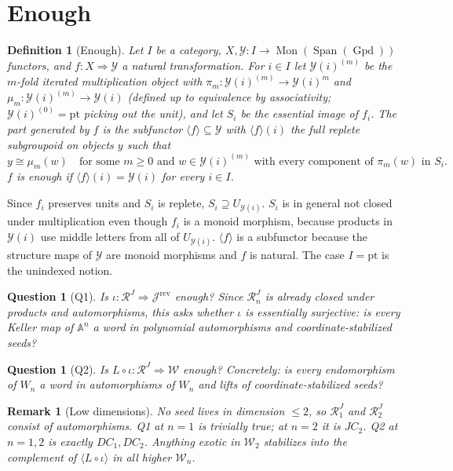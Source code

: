 \documentclass[11pt]{article}
\theoremstyle{change}
\newtheorem{definition}[equation]{Definition}
\newtheorem{question}[equation]{Question}
\newtheorem{remark}[equation]{Remark}
\theoremstyle{nonumberplain}
\renewcommand\AA{{\mathbb A}}
\newcommand\cJ{{\mathcal J}}
\newcommand\cW{{\mathcal W}}
\newcommand\cR{{\mathcal R}}
\newcommand\cY{{\mathcal Y}}
\newcommand\rev{{\mathrm{rev}}}
\DeclareMathOperator{\Gpd}{Gpd}
\DeclareMathOperator{\Span}{Span}
\DeclareMathOperator{\Mon}{Mon}
\begin{document}
\section{Enough}

\begin{definition}[Enough\label{enough}]
Let $I$ be a category, $X, \cY : I \to \Mon(\Span(\Gpd))$ functors, and $f : X \Rightarrow \cY$ a natural transformation. For $i \in I$ let $\cY(i)^{(m)}$ be the $m$-fold iterated multiplication object with $\pi_m : \cY(i)^{(m)} \to \cY(i)^m$ and $\mu_m : \cY(i)^{(m)} \to \cY(i)$ (defined up to equivalence by associativity; $\cY(i)^{(0)} = \mathrm{pt}$ picking out the unit), and let $S_i$ be the essential image of $f_i$. The \emph{part generated by $f$} is the subfunctor $\langle f \rangle \subseteq \cY$ with $\langle f \rangle(i)$ the full replete subgroupoid on objects $y$ such that
\begin{equation*}
y \cong \mu_m(w) \quad \text{for some } m \geq 0 \text{ and } w \in \cY(i)^{(m)} \text{ with every component of } \pi_m(w) \text{ in } S_i.
\end{equation*}
$f$ is \emph{enough} if $\langle f \rangle(i) = \cY(i)$ for every $i \in I$.
\end{definition}

Since $f_i$ preserves units and $S_i$ is replete, $S_i \supseteq U_{\cY(i)}$. $S_i$ is in general not closed under multiplication even though $f_i$ is a monoid morphism, because products in $\cY(i)$ use middle letters from all of $U_{\cY(i)}$. $\langle f \rangle$ is a subfunctor because the structure maps of $\cY$ are monoid morphisms and $f$ is natural. The case $I = \mathrm{pt}$ is the unindexed notion.

\begin{question}[Q1]\label{Q1}
Is $\iota : \cR^J \Rightarrow \cJ^\rev$ enough? Since $\cR^J_n$ is already closed under products and automorphisms, this asks whether $\iota$ is essentially surjective: is every Keller map of $\AA^n$ a word in polynomial automorphisms and coordinate-stabilized seeds?
\end{question}

\begin{question}[Q2]\label{Q2}
Is $L \circ \iota : \cR^J \Rightarrow \cW$ enough? Concretely: is every endomorphism of $W_n$ a word in automorphisms of $W_n$ and lifts of coordinate-stabilized seeds?
\end{question}

\begin{remark}[Low dimensions]
No seed lives in dimension $\leq 2$, so $\cR^J_1$ and $\cR^J_2$ consist of automorphisms. Q1 at $n = 1$ is trivially true; at $n = 2$ it is $JC_2$. Q2 at $n = 1, 2$ is exactly $DC_1, DC_2$. Anything exotic in $\cW_2$ stabilizes into the complement of $\langle L\circ\iota \rangle$ in all higher $\cW_n$.
\end{remark}
\end{document}
